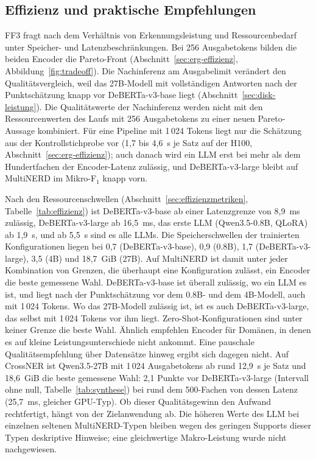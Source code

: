 \subsection{Effizienz und praktische Empfehlungen}
\label{sec:disk-effizienz}

FF3 fragt nach dem Verhältnis von Erkennungsleistung und Ressourcenbedarf
unter Speicher- und Latenzbeschränkungen.
Bei 256 Ausgabetokens bilden die beiden Encoder die Pareto-Front
(Abschnitt~\ref{sec:erg-effizienz}, Abbildung~\ref{fig:tradeoff}).
Die Nachinferenz am Ausgabelimit
verändert den Qualitätsvergleich, weil das
27B-Modell mit vollständigen Antworten nach der Punktschätzung knapp vor
DeBERTa-v3-base liegt (Abschnitt~\ref{sec:disk-leistung}). Die
Qualitätswerte der Nachinferenz werden nicht mit den
Ressourcenwerten des Laufs mit 256 Ausgabetokens zu einer neuen Pareto-Aussage
kombiniert.
Für eine Pipeline mit 1\,024 Tokens liegt nur die Schätzung aus der
Kontrollstichprobe vor (1,7 bis 4,6~s je Satz auf der H100,
Abschnitt~\ref{sec:erg-effizienz}); auch danach wird ein LLM erst bei
mehr als dem Hundertfachen der Encoder-Latenz zulässig, und
DeBERTa-v3-large bleibt auf MultiNERD im Mikro-F$_1$ knapp vorn.

Nach den Ressourcenschwellen (Abschnitt~\ref{sec:effizienzmetriken},
Tabelle~\ref{tab:effizienz}) ist DeBERTa-v3-base ab einer Latenzgrenze
von 8,9~ms zulässig, DeBERTa-v3-large ab 16,5~ms, das erste LLM
(Qwen3.5-0.8B, QLoRA) ab 1,9~s, und ab 5,5~s sind es alle LLMs.
Die Speicherschwellen der trainierten Konfigurationen liegen bei 0,7 (DeBERTa-v3-base), 0,9 (0.8B),
1,7 (DeBERTa-v3-large), 3,5 (4B) und 18,7~GiB (27B).
Auf MultiNERD ist damit unter jeder Kombination von Grenzen, die
überhaupt eine Konfiguration zulässt, ein Encoder die beste gemessene
Wahl. DeBERTa-v3-base ist überall zulässig, wo ein LLM es ist, und liegt
nach der Punktschätzung vor dem 0.8B- und dem 4B-Modell, auch mit 1\,024 Tokens.
Wo das 27B-Modell zulässig ist, ist es auch DeBERTa-v3-large, das selbst
mit 1\,024 Tokens vor ihm liegt.
Zero-Shot-Konfigurationen sind unter keiner Grenze die beste Wahl.
Ähnlich empfehlen \textcite[Abschn.~III]{obeidat2025llm} Encoder für
Domänen, in denen es auf kleine Leistungsunterschiede nicht ankommt.
Eine pauschale Qualitätsempfehlung über Datensätze hinweg ergibt sich
dagegen nicht. Auf CrossNER ist Qwen3.5-27B mit 1\,024 Ausgabetokens ab
rund 12,9~s je Satz und 18,6~GiB die beste gemessene Wahl: 2,1 Punkte vor
DeBERTa-v3-large (Intervall ohne null, Tabelle~\ref{tab:synthese}) bei
rund dem 500-Fachen von dessen Latenz (25,7~ms, gleicher GPU-Typ).
Ob dieser Qualitätsgewinn den Aufwand rechtfertigt, hängt von der
Zielanwendung ab. Die höheren Werte des LLM bei einzelnen seltenen
MultiNERD-Typen bleiben wegen des geringen Supports dieser Typen deskriptive
Hinweise; eine gleichwertige Makro-Leistung wurde nicht nachgewiesen.


